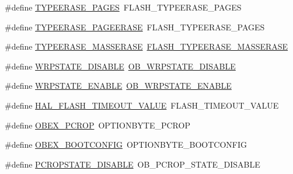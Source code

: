 \begin{DoxyCompactItemize}
\#define \hyperlink{group___h_a_l___f_l_a_s_h___aliased___defines_ga07a98a770e73711be26d0c9bef1c174c}{T\+Y\+P\+E\+E\+R\+A\+S\+E\+\_\+\+P\+A\+G\+ES}~F\+L\+A\+S\+H\+\_\+\+T\+Y\+P\+E\+E\+R\+A\+S\+E\+\_\+\+P\+A\+G\+ES
\item 
\#define \hyperlink{group___h_a_l___f_l_a_s_h___aliased___defines_ga75bd0c1de85562b5ca5369a7bb8d99d1}{T\+Y\+P\+E\+E\+R\+A\+S\+E\+\_\+\+P\+A\+G\+E\+E\+R\+A\+SE}~F\+L\+A\+S\+H\+\_\+\+T\+Y\+P\+E\+E\+R\+A\+S\+E\+\_\+\+P\+A\+G\+ES
\item 
\#define \hyperlink{group___h_a_l___f_l_a_s_h___aliased___defines_gad155d920d19e0d37f71a46dce3227209}{T\+Y\+P\+E\+E\+R\+A\+S\+E\+\_\+\+M\+A\+S\+S\+E\+R\+A\+SE}~\hyperlink{group___f_l_a_s_h_ex___type___erase_ga9bc03534e69c625e1b4f0f05c3852243}{F\+L\+A\+S\+H\+\_\+\+T\+Y\+P\+E\+E\+R\+A\+S\+E\+\_\+\+M\+A\+S\+S\+E\+R\+A\+SE}
\item 
\#define \hyperlink{group___h_a_l___f_l_a_s_h___aliased___defines_gafa6275edfe88cfcc063761a6394e475a}{W\+R\+P\+S\+T\+A\+T\+E\+\_\+\+D\+I\+S\+A\+B\+LE}~\hyperlink{group___f_l_a_s_h_ex___w_r_p___state_gaa34eb6205fe554f65a311ee974d5a4ab}{O\+B\+\_\+\+W\+R\+P\+S\+T\+A\+T\+E\+\_\+\+D\+I\+S\+A\+B\+LE}
\item 
\#define \hyperlink{group___h_a_l___f_l_a_s_h___aliased___defines_ga1a6d2287155d773e15bb4e5561913171}{W\+R\+P\+S\+T\+A\+T\+E\+\_\+\+E\+N\+A\+B\+LE}~\hyperlink{group___f_l_a_s_h_ex___w_r_p___state_ga9fc463145ab57616baa36d95523186a1}{O\+B\+\_\+\+W\+R\+P\+S\+T\+A\+T\+E\+\_\+\+E\+N\+A\+B\+LE}
\item 
\#define \hyperlink{group___h_a_l___f_l_a_s_h___aliased___defines_ga0c295495be438d4092e29488ac3ee897}{H\+A\+L\+\_\+\+F\+L\+A\+S\+H\+\_\+\+T\+I\+M\+E\+O\+U\+T\+\_\+\+V\+A\+L\+UE}~F\+L\+A\+S\+H\+\_\+\+T\+I\+M\+E\+O\+U\+T\+\_\+\+V\+A\+L\+UE
\item 
\#define \hyperlink{group___h_a_l___f_l_a_s_h___aliased___defines_ga1de788f8cf04b70320aaebf3388e638c}{O\+B\+E\+X\+\_\+\+P\+C\+R\+OP}~O\+P\+T\+I\+O\+N\+B\+Y\+T\+E\+\_\+\+P\+C\+R\+OP
\item 
\#define \hyperlink{group___h_a_l___f_l_a_s_h___aliased___defines_ga79284d41c929869394172fc526ff3d7e}{O\+B\+E\+X\+\_\+\+B\+O\+O\+T\+C\+O\+N\+F\+IG}~O\+P\+T\+I\+O\+N\+B\+Y\+T\+E\+\_\+\+B\+O\+O\+T\+C\+O\+N\+F\+IG
\item 
\#define \hyperlink{group___h_a_l___f_l_a_s_h___aliased___defines_ga09f7800119c1971e339df62f11beab14}{P\+C\+R\+O\+P\+S\+T\+A\+T\+E\+\_\+\+D\+I\+S\+A\+B\+LE}~O\+B\+\_\+\+P\+C\+R\+O\+P\+\_\+\+S\+T\+A\+T\+E\+\_\+\+D\+I\+S\+A\+B\+LE
\item 

\end{DoxyCompactItemize}
